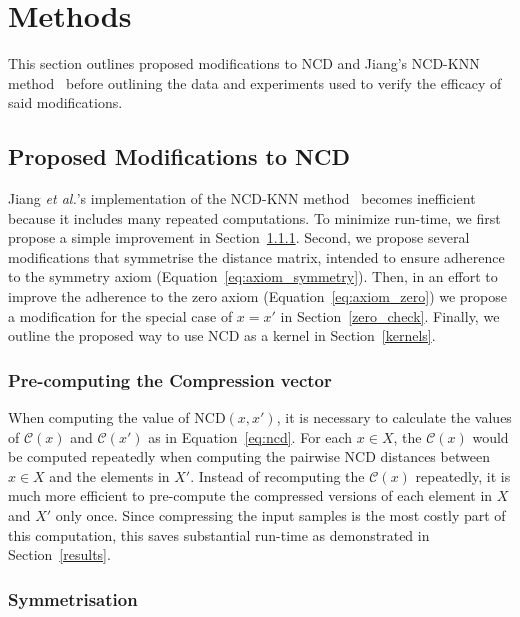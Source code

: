 \documentclass[preprint,12pt]{article}
\begin{document}
\section{Methods}
\label{methods}

This section outlines proposed modifications to NCD and Jiang's NCD-KNN method~\cite{jiang2022less} before outlining the data and experiments used to verify the efficacy of said modifications.



\subsection{Proposed Modifications to NCD}
\label{improvements}

Jiang \textit{et al.}'s implementation of the NCD-KNN method~\cite{jiang2022less} becomes inefficient because it includes many repeated computations.
To minimize run-time, we first propose a simple improvement in Section~\ref{pre_compute_compression}.
Second, we propose several modifications that symmetrise the distance matrix, intended to ensure adherence to the symmetry axiom (Equation~\ref{eq:axiom_symmetry}).
Then, in an effort to improve the adherence to the zero axiom (Equation~\ref{eq:axiom_zero}) we propose a modification for the special case of $x=x'$ in Section~\ref{zero_check}.
Finally, we outline the proposed way to use NCD as a kernel in Section~\ref{kernels}.


\subsubsection{Pre-computing the Compression vector}
\label{pre_compute_compression}

When computing the value of NCD$(x,x')$, it is necessary to calculate the values of $\mathcal{C}(x)$ and $\mathcal{C}(x')$ as in Equation~\ref{eq:ncd}. 
For each $x \in X$, the $\mathcal{C}(x)$ would be computed repeatedly when computing the pairwise NCD distances between $x\in X$ and the elements in $X'$.
Instead of recomputing the $\mathcal{C}(x)$ repeatedly, it is much more efficient to pre-compute the compressed versions of each element in $X$ and $X'$ only once.
Since compressing the input samples is the most costly part of this computation, this saves substantial run-time as demonstrated in Section~\ref{results}.


\subsubsection{Symmetrisation}
\label{symmetrisation}
\end{document}
